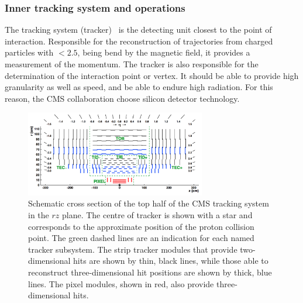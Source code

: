 {\subsubsection{Inner tracking system and operations}
The tracking system (tracker)~\cite{Chatrchyan:1704291} is the detecting unit closest to the point of interaction. Responsible for the reconstruction of  trajectories from charged particles with \abspsrap $<2.5$, being bend by the magnetic field, it provides a measurement of the momentum. The tracker is also responsible for the determination of the interaction point or vertex. It should be able to provide high granularity as well as speed, and be able to endure high radiation. For this reason, the CMS collaboration choose silicon detector technology.

\begin{figure}[ht]
	\centering
	\includegraphics[width=0.7\textwidth]{2_ExperimentalSetup/Figures/imageedit_11_9317262269}
  \caption{Schematic cross section of the top half of the CMS tracking system in the $rz$ plane. The centre of tracker is shown with a star and corresponds to the approximate position of the proton collision point. The green dashed lines are an indication for each named tracker subsystem. The strip tracker modules that provide two-dimensional hits are shown by thin, black lines, while those able to reconstruct three-dimensional hit positions are shown by thick, blue lines. The pixel modules, shown in red, also provide three-dimensional hits. \cite{Bayatian:2006zz} }
	\label{fig:Tracker}
\end{figure}

}
